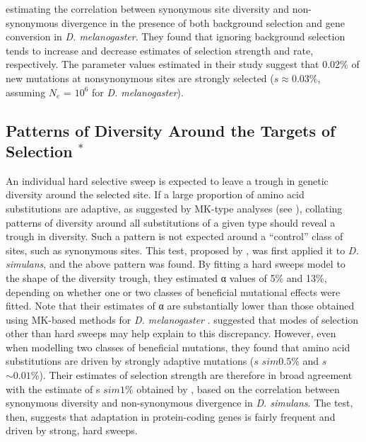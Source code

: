 estimating the correlation between synonymous site diversity and non-synonymous divergence in the presence of both background selection and gene conversion in \textit{D. melanogaster}. They found that ignoring background selection tends to increase and decrease estimates of selection strength and rate, respectively. The parameter values estimated in their study suggest that 0.02\% of new mutations at nonsynonymous sites are strongly selected ($s \approx 0.03\%$, assuming $N_e$ = $10^6$ for \textit{D. melanogaster}).
 
\subsection[Patterns of diversity around the targets of selection]{Patterns of Diversity Around the Targets of Selection $^*$}
 
An individual hard selective sweep is expected to leave a trough in genetic diversity around the selected site. If a large proportion of amino acid substitutions are adaptive, as suggested by MK-type analyses (see \citealt{RN215}), collating patterns of diversity around all substitutions of a given type should reveal a trough in diversity. Such a pattern is not expected around a “control” class of sites, such as synonymous sites. This test, proposed by \cite{RN167}, was first applied it to \textit{D. simulans}, and the above pattern was found. By fitting a hard sweeps model to the shape of the diversity trough, they estimated α values of  5\% and 13\%, depending on whether one or two classes of beneficial mutational effects were fitted. Note that their estimates of α are substantially lower than those obtained using MK-based methods for \textit{D. melanogaster} \citealt{RN283}. \cite{RN167} suggested that modes of selection other than hard sweeps may help explain to this discrepancy. However, even when modelling two classes of beneficial mutations, they found that amino acid substitutions are driven by strongly adaptive mutations ($s$ $sim0.5\%$ and $s$ $\sim0.01\%$). Their estimates of selection strength are therefore in broad agreement with the estimate of s $sim1\%$ obtained by \cite{RN289}, based on the correlation between synonymous diversity and non-synonymous divergence in \textit{D. simulans}. The \cite{RN167} test, then, suggests that adaptation in protein-coding genes is fairly frequent and driven by strong, hard sweeps.
 
